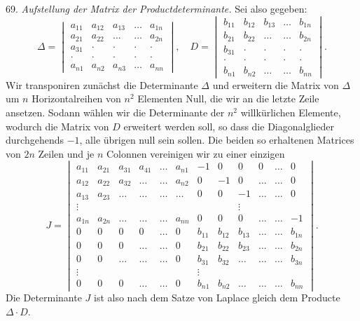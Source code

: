 \documentclass[11pt]{article}
\let\Delta\varDelta
\begin{document}
69. \textit{Aufstellung der Matrix der Productdeterminante.} Sei also
gegeben:
\[
\Delta = \begin{vmatrix}
a_{11} & a_{12} & a_{13} & \dots & a_{1n} \\
a_{21} & a_{22} & \dots & \dots & a_{2n} \\
a_{31} & \cdot & \cdot & \cdot & \cdot \\
\cdot & \cdot & \cdot & \cdot & \cdot \\
a_{n1} & a_{n2} & a_{n3} & \dots & a_{nn}
\end{vmatrix},
\quad
D = \begin{vmatrix}
b_{11} & b_{12} & b_{13} & \dots & b_{1n} \\
b_{21} & b_{22} & \dots & \dots & b_{2n} \\
b_{31} & \cdot & \cdot & \cdot & \cdot \\
\cdot & \cdot & \cdot & \cdot & \cdot \\
b_{n1} & b_{n2} & \dots & \dots & b_{nn}
\end{vmatrix}.
\]
Wir transponiren zunächst die Determinante $\Delta$ und erweitern die
Matrix von $\Delta$ um $n$ Horizontalreihen von $n^2$ Elementen Null,
die wir an die letzte Zeile ansetzen. Sodann wählen wir die
Determinante der $n^2$ willkürlichen Elemente, wodurch die Matrix von
$D$ erweitert werden soll, so dass die Diagonalglieder durchgehends
$-1$, alle übrigen null sein sollen. Die beiden so erhaltenen Matrices
von $2n$ Zeilen und je $n$ Colonnen vereinigen wir zu einer einzigen
\[
J = \begin{vmatrix}
a_{11} & a_{21} & a_{31} & a_{41} & \dots & a_{n1} & -1 & 0 & 0 & 0 & \dots & 0 \\
a_{12} & a_{22} & a_{32} & \dots & \dots & a_{n2} & 0 & -1 & 0 & \dots & \dots & 0 \\
a_{13} & a_{23} & \dots & \dots & \dots & \dots & 0 & 0 & -1 & \dots & \dots & 0 \\
\vdots & & & & & & & & \vdots & & & \\
a_{1n} & a_{2n} & \dots & \dots & \dots & a_{nn} & 0 & 0 & 0 & \dots & \dots & -1 \\
0 & 0 & 0 & 0 & \dots & 0 & b_{11} & b_{12} & b_{13} & \dots & \dots & b_{1n} \\
0 & 0 & 0 & \dots & \dots & 0 & b_{21} & b_{22} & b_{23} & \dots & \dots & b_{2n} \\
0 & 0 & \dots & \dots & \dots & 0 & b_{31} & b_{32} & \dots & \dots & \dots & b_{3n} \\
\vdots & & & & & & \vdots & & & & & \\
0 & 0 & 0 & \dots & \dots & 0 & b_{n1} & b_{n2} & \dots & \dots & \dots & b_{nn}
\end{vmatrix}.
\]
Die Determinante $J$ ist also nach dem Satze von Laplace gleich dem
Producte $\Delta \cdot D$.
\end{document}
